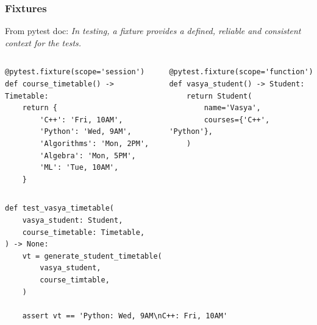 \documentclass[compress]{beamer}
\begin{document}
\begin{frame}[fragile]
\frametitle{Fixtures\footnotemark[1]}

\begin{overprint}

From pytest doc: \textit{In testing, a fixture provides a defined, reliable and consistent context for the tests.}

\vspace{0.3in}

\begin{columns}[T]
\begin{column}{.5\textwidth}
\begin{verbatim}
@pytest.fixture(scope='session')
def course_timetable() -> Timetable:
    return {
        'C++': 'Fri, 10AM',
        'Python': 'Wed, 9AM',
        'Algorithms': 'Mon, 2PM',
        'Algebra': 'Mon, 5PM',
        'ML': 'Tue, 10AM',
    }
\end{verbatim}
\end{column}
\begin{column}{.5\textwidth}
\begin{verbatim}
@pytest.fixture(scope='function')
def vasya_student() -> Student:
    return Student(
        name='Vasya',
        courses={'C++', 'Python'},
    )
\end{verbatim}
\end{column}
\end{columns}


\begin{center}
\begin{verbatim}
def test_vasya_timetable(
    vasya_student: Student,
    course_timetable: Timetable,
) -> None:
    vt = generate_student_timetable(
        vasya_student,
        course_timtable,
    )

    assert vt == 'Python: Wed, 9AM\nC++: Fri, 10AM'
\end{verbatim}
\end{center}

\end{overprint}


\end{frame}
\end{document}
